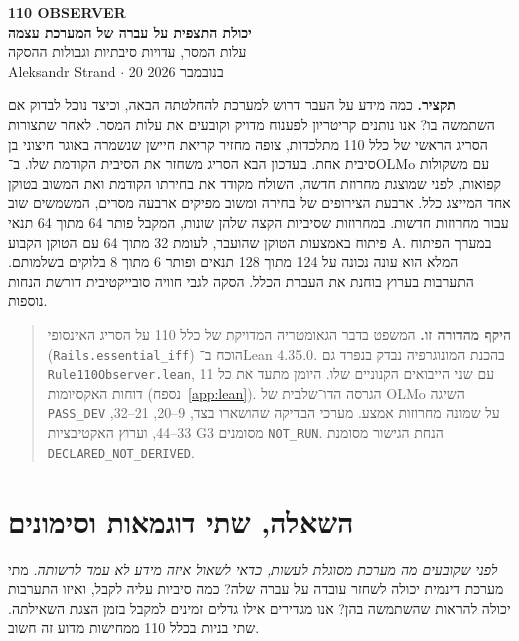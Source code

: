 \documentclass[11pt,a4paper]{article}
\DeclareRobustCommand{\textenglish}[1]{\foreignlanguage{english}{#1}}
\theoremstyle{definition}
\begin{document}
\sloppy
\begin{center}
{\small\bfseries\color{accent}\textenglish{110 OBSERVER}}\\[7pt]
{\LARGE\bfseries יכולת התצפית על עברה של המערכת עצמה}\\[5pt]
{\large עלות המסר, עדויות סיבתיות וגבולות ההסקה}\\[10pt]
\textenglish{Aleksandr Strand} \hspace{1em} $\cdot$ \hspace{1em} 20 בנובמבר 2026
\end{center}
\noindent\textbf{תקציר.} כמה מידע על העבר דרוש למערכת להחלטתה הבאה, וכיצד נוכל לבדוק אם השתמשה בו? אנו נותנים קריטריון לפענוח מדויק וקובעים את עלות המסר. לאחר שתצורות הסריג הראשי של כלל 110 מתלכדות, צופה מחזיר קריאת חיישן שנשמרה באוגר חיצוני בן סיבית אחת. בעדכון הבא הסריג משחזר את הסיבית הקודמת שלו. ב־\textenglish{OLMo} עם משקולות קפואות, לפני שמוצגת מחרוזת חדשה, השולח מקודד את בחירתו הקודמת ואת המשוב בטוקן אחד המייצג כלל. ארבעת הצירופים של בחירה ומשוב מפיקים ארבעה מסרים, המשמשים שוב עבור מחרוזות חדשות. במחרוזות שסיביות הקצה שלהן שונות, המקבל פותר 64 מתוך 64 תנאי פיתוח באמצעות הטוקן שהועבר, לעומת 32 מתוך 64 עם הטוקן הקבוע \textenglish{A}. במערך הפיתוח המלא הוא עונה נכונה על 124 מתוך 128 תנאים ופותר 6 מתוך 8 בלוקים בשלמותם. התערבות בערוץ בוחנת את העברת הכלל. הסקה לגבי חוויה סובייקטיבית דורשת הנחות נוספות.

\begin{quote}\small
\textbf{היקף מהדורה זו.} המשפט בדבר הגאומטריה המדויקת של כלל 110 על הסריג האינסופי (\textenglish{\texttt{Rails.essential\_iff}}) הוכח ב־\textenglish{Lean 4.35.0}. בהכנת המונוגרפיה נבדק בנפרד גם \textenglish{\texttt{Rule110Observer.lean}}, עם שני הייבואים הקנוניים שלו. היומן מתעד את כל 11 דוחות האקסיומות (נספח~\ref{app:lean}). הגרסה הדו־שלבית של \textenglish{OLMo} השיגה \textenglish{\texttt{PASS\_DEV}} על שמונה מחרוזות אמצע. מערכי הבדיקה שהושארו בצד, \textenglish{9--20, 21--32, 33--44}, וערוץ האקטיבציות \textenglish{G3} מסומנים \textenglish{\texttt{NOT\_RUN}}. הנחת הגישור מסומנת \textenglish{\texttt{DECLARED\_NOT\_DERIVED}}.
\end{quote}
\tableofcontents
\clearpage

\section{השאלה, שתי דוגמאות וסימונים}
\emph{לפני שקובעים מה מערכת מסוגלת לעשות, כדאי לשאול איזה מידע לא עמד לרשותה.}
מתי מערכת דינמית יכולה לשחזר עובדה על עברה שלה? כמה סיביות עליה לקבל, ואיזו התערבות יכולה להראות שהשתמשה בהן? אנו מגדירים אילו גדלים זמינים למקבל בזמן הצגת השאילתה. שתי בניות בכלל 110 ממחישות מדוע זה חשוב.
\end{document}

